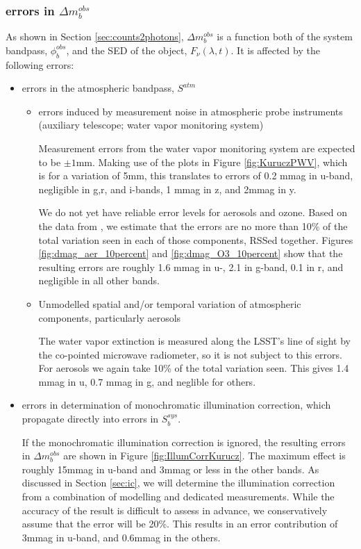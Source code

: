 \documentclass[12pt,preprint]{aastex}
\begin{document}
\subsubsection{errors in $\Delta m_b^{obs}$}
As shown in Section \ref{sec:counts2photons}, $\Delta m_b^{obs}$ is a function both of the system bandpass, $\phi_b^{obs}$, and the SED of the object, $F_{\nu}(\lambda, t)$.   It is affected by the following errors:
\begin{itemize}
\item{errors in the atmospheric bandpass, $S^{atm}$
	\begin{itemize}
	\item{errors induced by measurement noise in atmospheric probe instruments (auxiliary telescope; water vapor monitoring system)}
	
	Measurement errors from the water vapor monitoring system are expected to be $\pm 1$mm.  Making use of the plots in 
	Figure \ref{fig:KuruczPWV}, which is for a variation of 5mm, this translates to errors of 0.2 mmag in u-band, 
	negligible in g,r, and i-bands, 1 mmag in z, and 2mmag in y.
	
	We do not yet have reliable error levels for aerosols and ozone.  Based on the data from \cite{Burke2010b},
	we estimate that the errors are no more than 10\% of the total variation seen in each of those components,
	RSSed together.  
	Figures \ref{fig:dmag_aer_10percent} and \ref{fig:dmag_O3_10percent} show that the resulting errors are 
	roughly 1.6 mmag in u-, 2.1 in g-band, 
	0.1 in r, and negligible in all other bands.
	 
	\item{Unmodelled spatial and/or temporal variation of atmospheric components, particularly aerosols}
	
	The water vapor extinction is measured along the LSST's line of sight by the co-pointed microwave radiometer, so it is 
	not subject to this errors.  For aerosols we again take 10\% of the total variation seen.  This gives 1.4 mmag in u, 
	0.7 mmag in g, and neglible for others.
	
	
	\end{itemize}
	}
\item{errors in determination of monochromatic illumination correction, which propagate directly into errors in $S_b^{sys}$.  

If the monochromatic illumination correction is ignored, the resulting errors in $\Delta m_b^{obs}$ are shown in Figure \ref{fig:IllumCorrKurucz}.  The maximum effect is roughly 15mmag in u-band and 3mmag or less in the other bands.  As discussed in Section \ref{sec:ic}, we will determine the illumination correction from a combination of modelling and dedicated measurements.
While the accuracy of the result is difficult to assess in advance, we conservatively assume that the error will be 20\%. 
This results in an error contribution of 3mmag in u-band, and 0.6mmag in the others.
}


\end{itemize}
\end{document}
